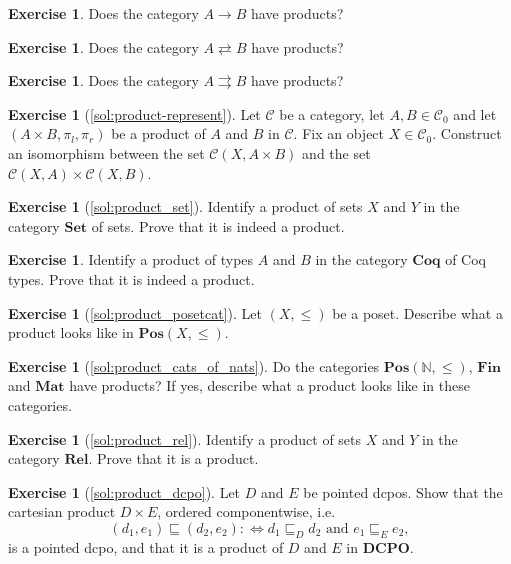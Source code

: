 \documentclass[a4paper,11pt, oneside,titlepage=false]{scrbook}
\theoremstyle{plain}
\theoremstyle{definition}
\newtheorem{exer}[thm]{Exercise}
\newcommand{\Cat}[1]{\mathcal{#1}}
\newcommand{\CC}{\Cat{C}}
\newcommand{\Catb}[1]{\mathbf{#1}}
\newcommand{\SET}{\Catb{Set}}
\newcommand{\POS}{\Catb{Pos}}
\newcommand{\DCPO}{\Catb{DCPO}}
\newcommand{\COQ}{\Catb{Coq}}
\newcommand{\MAT}{\Catb{Mat}}
\newcommand{\SKELFINSET}{\Catb{Fin}}
\newcommand{\REL}{\Catb{Rel}}
\newcommand{\Ob}[1]{{#1}_0}
\newcommand{\projl}{\ensuremath{\pi_l}}
\newcommand{\projr}{\ensuremath{\pi_r}}
\newcommand{\NN}{\ensuremath{\mathbb{N}}}
\begin{document}
\begin{exer}
  Does the category $A \to B$ have products?
\end{exer}

\begin{exer}
  Does the category $A \rightleftarrows B$ have products?
\end{exer}

\begin{exer}
  Does the category $A \rightrightarrows B$ have products?
\end{exer}

\begin{exer}[\cref{sol:product-represent}]\label{exer:product-represent}
  Let $\CC$ be a category, let $A,B\in\Ob{\CC}$ and let $(A\times B,\projl,\projr)$ be a product of $A$ and $B$ in $\CC$. Fix an object $X\in\Ob{\CC}$. Construct an isomorphism between the set $\CC(X, A\times B)$ and the set $\CC(X,A)\times\CC(X,B)$.
\end{exer}

\begin{exer}[\cref{sol:product_set}]\label{exer:product_set}
  Identify a product of sets $X$ and $Y$ in the category $\SET$ of sets.
  Prove that it is indeed a product.
\end{exer}

\begin{exer}
  Identify a product of types $A$ and $B$ in the category $\COQ$ of Coq types.
  Prove that it is indeed a product.
\end{exer}

\begin{exer}[\cref{sol:product_posetcat}]\label{exer:product_posetcat}
  Let $(X,\leq)$ be a poset. Describe what a product looks like in  $\POS(X,\leq)$.
\end{exer}

\begin{exer}[\cref{sol:product_cats_of_nats}]\label{exer:product_cats_of_nats}
  Do the categories $\POS(\NN, \leq)$, $\SKELFINSET$ and $\MAT$ have products? If yes, describe what a product looks like in these categories.
\end{exer}

\begin{exer}[\cref{sol:product_rel}] \label{exer:product_rel}
  Identify a product of sets $X$ and $Y$ in the category $\REL$. Prove that it is a product.
\end{exer}

\begin{exer}[\cref{sol:product_dcpo}]\label{exer:product_dcpo}
  Let $D$ and $E$ be pointed dcpos.
  Show that the cartesian product $D \times E$, ordered componentwise, i.e.
  \[ (d_1,e_1) \sqsubseteq (d_2,e_2) :\iff d_1 \sqsubseteq_D d_2 \text{ and } e_1 \sqsubseteq_E e_2, \]
  is a pointed dcpo, and that it is a product of $D$ and $E$ in $\DCPO$.
\end{exer}
\end{document}

